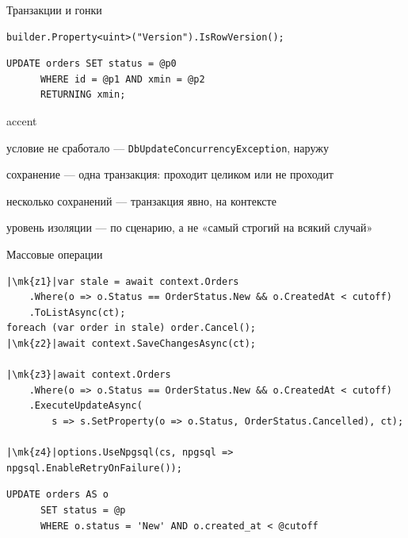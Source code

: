 \documentclass[aspectratio=169,10pt,t]{beamer}
\newcommand{\codesm}{\ttfamily\fontsize{7.6}{9.0}\selectfont}
\newcommand{\codexxs}{\ttfamily\fontsize{6.8}{7.8}\selectfont}
\newcommand{\termsm}{\ttfamily\fontsize{6.6}{7.9}\selectfont}
\newcommand{\mk}[1]{\tikz[remember picture,overlay]\coordinate (#1) at (0,0.55ex);}
\begin{document}
\begin{frame}[fragile]{Транзакции и гонки}
  \slidetop

\begin{lstlisting}[style=csharp,basicstyle=\codesm]
builder.Property<uint>("Version").IsRowVersion();
\end{lstlisting}

\begin{lstlisting}[style=term,basicstyle=\termsm]
      UPDATE orders SET status = @p0
      WHERE id = @p1 AND xmin = @p2
      RETURNING xmin;
\end{lstlisting}

  \begin{cbul}{accent}
    \item условие не сработало --- \texttt{DbUpdateConcurrencyException}, наружу
    \item сохранение --- одна транзакция: проходит целиком или не проходит
    \item несколько сохранений --- транзакция явно, на контексте
    \item уровень изоляции --- по сценарию, а не «самый строгий на всякий случай»
  \end{cbul}
\end{frame}

\begin{frame}[fragile]{Массовые операции}
  \vspace{0.3em}
\begin{lstlisting}[style=csharp,basicstyle=\codexxs,escapechar=|]
|\mk{z1}|var stale = await context.Orders
    .Where(o => o.Status == OrderStatus.New && o.CreatedAt < cutoff)
    .ToListAsync(ct);
foreach (var order in stale) order.Cancel();
|\mk{z2}|await context.SaveChangesAsync(ct);

|\mk{z3}|await context.Orders
    .Where(o => o.Status == OrderStatus.New && o.CreatedAt < cutoff)
    .ExecuteUpdateAsync(
        s => s.SetProperty(o => o.Status, OrderStatus.Cancelled), ct);

|\mk{z4}|options.UseNpgsql(cs, npgsql => npgsql.EnableRetryOnFailure());
\end{lstlisting}

\begin{lstlisting}[style=term,basicstyle=\termsm]
      UPDATE orders AS o
      SET status = @p
      WHERE o.status = 'New' AND o.created_at < @cutoff
\end{lstlisting}

\end{frame}
\end{document}
